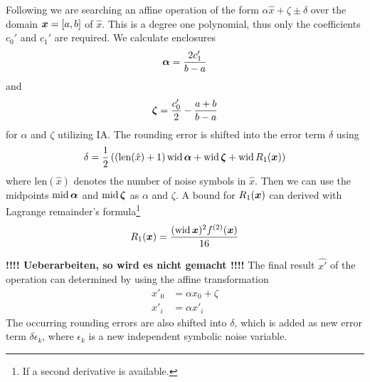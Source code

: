 \documentclass[a4]{scrartcl}
\newcommand{\iv}[2]{\ensuremath{[#1, #2]}\xspace}
\newcommand{\aff}[1]{\ensuremath{\hat{#1}}\xspace}
\newcommand{\yalaa}{\texttt{YalAA}\xspace}
\begin{document}
Following \cite{stolfi1997} we are searching an affine operation of the form
$\alpha \aff x + \zeta \pm \delta$ over the domain $\x = \iv{a}{b}$ of $\aff x$.
This is a degree one polynomial, thus only the coefficients $c_0'$ and $c_1'$
are required. We calculate enclosures
\[
\ialpha = \frac{2 c_1'}{b-a}
\]
and
\[
\izeta = \frac{c_0'}{2} - \frac{a+b}{b-a}
\]
for $\alpha$ and $\zeta$ utilizing IA. The rounding error is shifted into the
error term $\delta$ using
\[
\delta = \frac 1 2 \left ( \left (\mathrm{len}(\aff x) + 1 \right )\wid \ialpha + \wid \izeta  +
  \wid R_1(\x) \right) 
\]
where $\mathrm{len}(\aff x)$ denotes the number of noise symbols in $\aff x$.
Then we can use the midpoints $\imid \ialpha$ and $\imid \izeta$ as $\alpha$ and
$\zeta$. A bound for $R_1(\x)$ can derived with Lagrange remainder's
formula\footnote{If a second derivative is available.}
\[
R_1(\x) = \frac{(\wid \x)^2 f^{(2)}(\x)}{16}
\]

\textbf{!!!! Ueberarbeiten, so wird es nicht gemacht !!!!}
The final result $\aff{x'}$ of the operation can determined by using the
affine transformation
\[
\begin{array}{ll}
  x'_0 &= \alpha x_0 + \zeta\\
  x'_i &= \alpha x'_i   
\end{array}
\]
The occurring rounding errors are also shifted into $\delta$, which is added
as new error term $\delta \epsilon_k$, where $\epsilon_k$ is a new independent
symbolic noise variable. 
\end{document}
